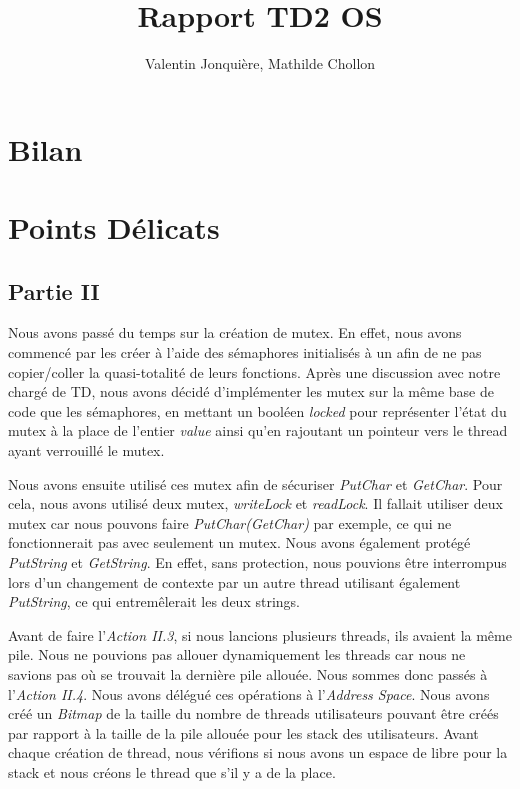 \documentclass{article}
\author{
    Valentin Jonquière,
    Mathilde Chollon
}
\title{Rapport TD2 OS}
\begin{document}
\maketitle

\pagebreak

\tableofcontents

\pagebreak

\section{Bilan}

\section{Points Délicats}
\subsection{Partie II}
Nous avons passé du temps sur la création de mutex. En effet, nous avons
commencé par les créer à l'aide des sémaphores initialisés à un afin de ne pas
copier/coller la quasi-totalité de leurs fonctions. Après une discussion avec
notre chargé de TD, nous avons décidé d'implémenter les mutex sur la même base
de code que les sémaphores, en mettant un booléen \textit{locked} pour
représenter l'état du mutex à la place de l'entier \textit{value} ainsi qu'en
rajoutant un pointeur vers le thread ayant verrouillé le mutex.

Nous avons ensuite utilisé ces mutex afin de sécuriser \textit{PutChar} et \textit{GetChar}.
Pour cela, nous avons utilisé deux mutex, \textit{writeLock} et \textit{readLock}. Il fallait utiliser
deux mutex car nous pouvons faire \textit{PutChar(GetChar)} par exemple, ce qui ne fonctionnerait
pas avec seulement un mutex. Nous avons également protégé \textit{PutString} et \textit{GetString}.
En effet, sans protection, nous pouvions être interrompus lors d'un changement de contexte par un autre
thread utilisant également \textit{PutString}, ce qui entremêlerait les deux strings.


Avant de faire l'\textit{Action II.3}, si nous lancions plusieurs threads, ils avaient la même pile.
Nous ne pouvions pas allouer dynamiquement les threads car nous ne savions pas où se trouvait
la dernière pile allouée. Nous sommes donc passés à l'\textit{Action II.4}. Nous avons délégué
ces opérations à l'\textit{Address Space}. Nous avons créé un \textit{Bitmap} de la taille du nombre de threads utilisateurs pouvant être créés
par rapport à la taille de la pile allouée pour les stack des utilisateurs. Avant chaque création
de thread, nous vérifions si nous avons un espace de libre pour la stack et nous créons le thread que s'il y a de la place.
\end{document}
